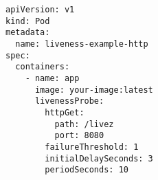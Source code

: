 \begin{verbatim}
apiVersion: v1
kind: Pod
metadata:
  name: liveness-example-http
spec:
  containers:
    - name: app
      image: your-image:latest
      livenessProbe:
        httpGet:
          path: /livez
          port: 8080
        failureThreshold: 1
        initialDelaySeconds: 3
        periodSeconds: 10
\end{verbatim}